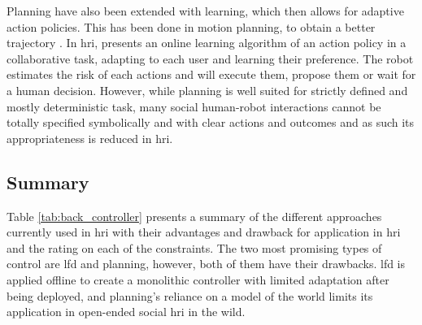     
    
    Planning have also been extended with learning, which then allows for adaptive action policies. This has been done in motion planning, to obtain a better trajectory \citep{jain2013learning,beetz2004rpllearn}. In \gls{hri}, \cite{munzer2017efficient} presents an online learning algorithm of an action policy in a collaborative task, adapting to each user and learning their preference. The robot estimates the risk of each actions and will execute them, propose them or wait for a human decision.     However, while planning is well suited for strictly defined and mostly deterministic task, many social human-robot interactions cannot be totally specified symbolically and with clear actions and outcomes and as such its appropriateness is reduced in \gls{hri}.
	
	
	
\subsection{Summary}

	Table \ref{tab:back_controller} presents a summary of the different approaches currently used in \gls{hri} with their advantages and drawback for application in \gls{hri} and the rating on each of the constraints. The two most promising types of control are \gls{lfd} and planning, however, both of them have their drawbacks. \gls{lfd} is applied offline to create a monolithic controller with limited adaptation after being deployed, and planning's reliance on a model of the world limits its application in open-ended social \gls{hri} in the wild.
	
